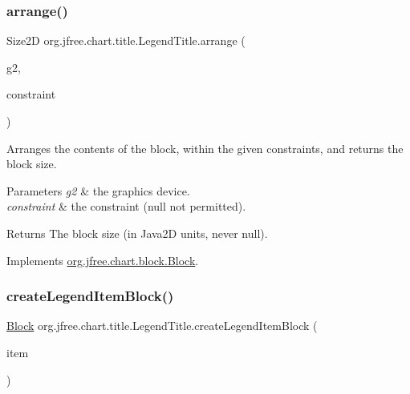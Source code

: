 \subsubsection{\texorpdfstring{arrange()}{arrange()}}
{\footnotesize\ttfamily Size2D org.\+jfree.\+chart.\+title.\+Legend\+Title.\+arrange (\begin{DoxyParamCaption}\item[{Graphics2D}]{g2,  }\item[{\mbox{\hyperlink{classorg_1_1jfree_1_1chart_1_1block_1_1_rectangle_constraint}{Rectangle\+Constraint}}}]{constraint }\end{DoxyParamCaption})}

Arranges the contents of the block, within the given constraints, and returns the block size.


\begin{DoxyParams}{Parameters}
{\em g2} & the graphics device. \\
\hline
{\em constraint} & the constraint ({\ttfamily null} not permitted).\\
\hline
\end{DoxyParams}
\begin{DoxyReturn}{Returns}
The block size (in Java2D units, never {\ttfamily null}). 
\end{DoxyReturn}


Implements \mbox{\hyperlink{interfaceorg_1_1jfree_1_1chart_1_1block_1_1_block_ab4cabbc237c5277a4a0018bab930e5fe}{org.\+jfree.\+chart.\+block.\+Block}}.

\mbox{\label{classorg_1_1jfree_1_1chart_1_1title_1_1_legend_title_a091d582c8a45e6399e6a61419c423165}} 
\subsubsection{\texorpdfstring{create\+Legend\+Item\+Block()}{createLegendItemBlock()}}
{\footnotesize\ttfamily \mbox{\hyperlink{interfaceorg_1_1jfree_1_1chart_1_1block_1_1_block}{Block}} org.\+jfree.\+chart.\+title.\+Legend\+Title.\+create\+Legend\+Item\+Block (\begin{DoxyParamCaption}\item[{\mbox{\hyperlink{classorg_1_1jfree_1_1chart_1_1_legend_item}{Legend\+Item}}}]{item }\end{DoxyParamCaption})\hspace{0.3cm}{\ttfamily [protected]}}

